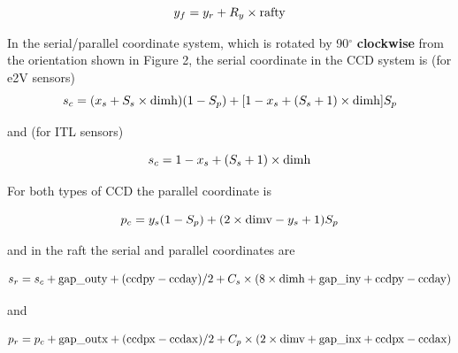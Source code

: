 \documentclass{article}[12pt]
\begin{document}
{\begin{equation}
y_f = y_r + R_y \times {\rm rafty}
\end{equation}





In the serial/parallel coordinate system, which is rotated by 90$^\circ$ {\bf clockwise} from the orientation shown in Figure 2, the serial coordinate in the CCD system is (for e2V sensors)
\begin{equation}
s_c = (x_s + S_s \times {\rm dimh}) (1 - S_p) + [1 - x_s + (S_s + 1) \times {\rm dimh}] S_p
\end{equation}

and (for ITL sensors)

\begin{equation}
s_c = 1 - x_s + (S_s + 1) \times {\rm dimh}
\end{equation}

For both types of CCD the parallel coordinate is

\begin{equation}
p_c = y_s  (1 - S_p) + (2 \times {\rm dimv} - y_s + 1) S_p
\end{equation}

and in the raft the serial and parallel coordinates are

\begin{equation}
s_r = s_c + {\rm gap\_outy} + ({\rm ccdpy} - {\rm ccday})/2 + C_s \times (8 \times {\rm dimh} + {\rm gap\_iny} + {\rm ccdpy} - {\rm ccday})
\end{equation}

and

\begin{equation}
p_r = p_c + {\rm gap\_outx} + ({\rm ccdpx} - {\rm ccdax})/2 + C_p \times (2 \times {\rm dimv} + {\rm gap\_inx} + {\rm ccdpx} - {\rm ccdax})
\end{equation}

}
\end{document}
